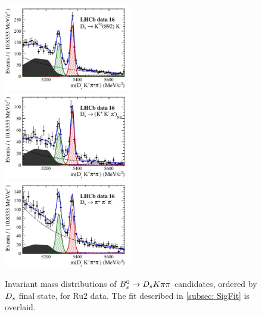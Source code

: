 \begin{figure}[h]
\includegraphics[height=!,width=0.5\textwidth]{figs/signal_y16_KsK.pdf}
\includegraphics[height=!,width=0.5\textwidth]{figs/signal_y16_KKpi_NR.pdf}
\includegraphics[height=!,width=0.5\textwidth]{figs/signal_y16_pipipi.pdf}
\caption{Invariant mass distributions of ${{B}^0_{s}}\rightarrow{\ensuremath{{D}_{s}}}{\ensuremath{K}}{\ensuremath{\pi}}{\ensuremath{\pi}}$ candidates, ordered by ${{D}_{s}}$ final state, for Ru2 data.
The fit described in \ref{subsec: SigFit} is overlaid.}
\label{fig:massfits_signal_Run2}
\end{figure}

